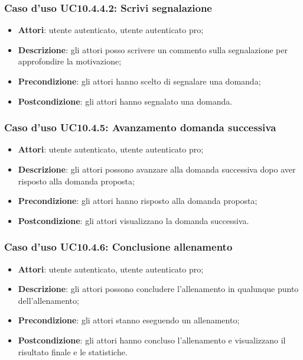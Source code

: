 \subsubsection{Caso d'uso UC10.4.4.2: Scrivi segnalazione}
	\begin{itemize}
		\item \textbf{Attori}: utente autenticato, utente autenticato pro;
		\item \textbf{Descrizione}: gli attori posso scrivere un commento sulla segnalazione per approfondire la motivazione;
		\item \textbf{Precondizione}: gli attori hanno scelto di segnalare una domanda;
		\item \textbf{Postcondizione}: gli attori hanno segnalato una domanda.
	\end{itemize}
\subsubsection{Caso d'uso UC10.4.5: Avanzamento domanda successiva}
	\begin{itemize}
		\item \textbf{Attori}: utente autenticato, utente autenticato pro;
		\item \textbf{Descrizione}: gli attori possono avanzare alla domanda successiva dopo aver risposto alla domanda proposta; 
		\item \textbf{Precondizione}: gli attori hanno risposto alla domanda proposta;
		\item \textbf{Postcondizione}: gli attori visualizzano la domanda successiva.
	\end{itemize}
\subsubsection{Caso d'uso UC10.4.6: Conclusione allenamento}
	\begin{itemize}
		\item \textbf{Attori}: utente autenticato, utente autenticato pro;
		\item \textbf{Descrizione}: gli attori possono concludere l'allenamento in qualunque punto dell'allenamento;
		\item \textbf{Precondizione}: gli attori stanno eseguendo un allenamento;
		\item \textbf{Postcondizione}: gli attori hanno concluso l'allenamento e visualizzano il risultato finale e le statistiche.
	\end{itemize}